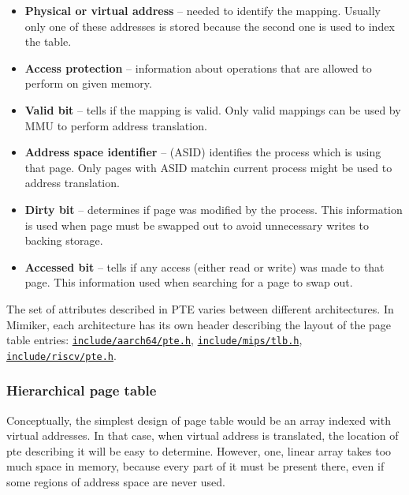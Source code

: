 \begin{itemize}
  \item {\bf Physical or virtual address}
    -- needed to identify the mapping.
    Usually only one of these addresses is stored because the second one is used to index the table.

  \item {\bf Access protection}
    -- information about operations that are allowed to perform on given memory.

  \item {\bf Valid bit}
    -- tells if the mapping is valid.
    Only valid mappings can be used by MMU to perform address translation.

  \item {\bf Address space identifier}
    -- (ASID) identifies the process which is using that page.
    Only pages with ASID matchin current process might be used to address translation.

  \item {\bf Dirty bit}
    -- determines if page was modified by the process.
    This information is used when page must be swapped out to avoid unnecessary writes to backing storage.

  \item {\bf Accessed bit}
    -- tells if any access (either read or write) was made to that page.
    This information used when searching for a page to swap out.
\end{itemize}

The set of attributes described in PTE varies between different architectures.
In Mimiker, each architecture has its own header describing the layout of the page table entries:
\href{https://github.com/cahirwpz/mimiker/blob/master/include/aarch64/pte.h}{\tt include/aarch64/pte.h},
\href{https://github.com/cahirwpz/mimiker/blob/master/include/mips/tlb.h}{\tt include/mips/tlb.h},
\href{https://github.com/cahirwpz/mimiker/blob/master/include/riscv/pte.h}{\tt include/riscv/pte.h}.

\subsubsection{Hierarchical page table}


Conceptually, the simplest design of page table would be an array indexed with virtual addresses.
In that case, when virtual address is translated, the location of pte describing it will be easy to determine.
However, one, linear array takes too much space in memory, because every part of it must be present there, even if some regions of address space are never used.

